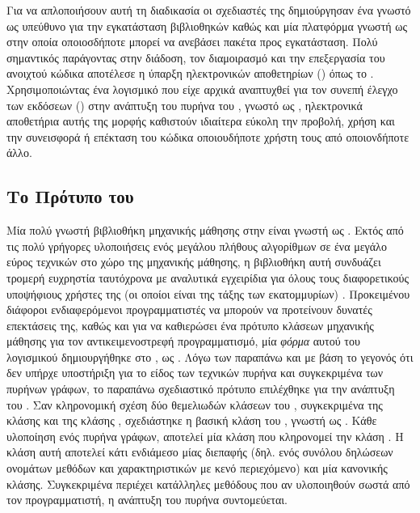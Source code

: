 Για να απλοποιήσουν αυτή τη διαδικασία οι σχεδιαστές της  δημιούργησαν ένα  γνωστό ως  υπεύθυνο για την εγκατάσταση βιβλιοθηκών καθώς και μία πλατφόρμα γνωστή ως  στην οποία οποιοσδήποτε μπορεί να ανεβάσει πακέτα προς εγκατάσταση.
Πολύ σημαντικός παράγοντας στην διάδοση, τον διαμοιρασμό και την επεξεργασία του ανοιχτού κώδικα αποτέλεσε η ύπαρξη ηλεκτρονικών αποθετηρίων () όπως το .
Χρησιμοποιώντας ένα λογισμικό που είχε αρχικά αναπτυχθεί για τον συνεπή έλεγχο των εκδόσεων () στην ανάπτυξη του πυρήνα του , γνωστό ως , ηλεκτρονικά αποθετήρια αυτής της μορφής καθιστούν ιδιαίτερα εύκολη την προβολή, χρήση και την συνεισφορά ή επέκταση του κώδικα οποιουδήποτε χρήστη τους από οποιονδήποτε άλλο.
\subsection{Το Πρότυπο του }
Μία πολύ γνωστή βιβλιοθήκη μηχανικής μάθησης στην  είναι γνωστή ως .
Εκτός από τις πολύ γρήγορες υλοποιήσεις ενός μεγάλου πλήθους αλγορίθμων σε ένα μεγάλο εύρος τεχνικών στο χώρο της μηχανικής μάθησης, η βιβλιοθήκη αυτή συνδυάζει τρομερή ευχρηστία ταυτόχρονα με αναλυτικά εγχειρίδια για όλους τους διαφορετικούς υποψήφιους χρήστες της (οι οποίοι είναι της τάξης των εκατομμυρίων) \cite{scikit}.
Προκειμένου διάφοροι ενδιαφερόμενοι προγραμματιστές να μπορούν να προτείνουν δυνατές επεκτάσεις της, καθώς και για να καθιερώσει ένα πρότυπο κλάσεων μηχανικής μάθησης για τον αντικειμενοστρεφή προγραμματισμό, μία \textit{φόρμα} αυτού του λογισμικού  δημιουργήθηκε στο , ως .
Λόγω των παραπάνω και με βάση το γεγονός ότι δεν υπήρχε υποστήριξη για το είδος των τεχνικών πυρήνα και συγκεκριμένα των πυρήνων γράφων, το παραπάνω σχεδιαστικό πρότυπο επιλέχθηκε για την ανάπτυξη του .
Σαν κληρονομική σχέση δύο θεμελιωδών κλάσεων του \texttt{}, συγκεκριμένα της κλάσης  και της κλάσης , σχεδιάστηκε η βασική κλάση του , γνωστή ως .
Κάθε υλοποίηση ενός πυρήνα γράφων, αποτελεί μία κλάση που κληρονομεί την κλάση . 
Η κλάση αυτή αποτελεί κάτι ενδιάμεσο μίας διεπαφής (δηλ. ενός συνόλου δηλώσεων ονομάτων μεθόδων και χαρακτηριστικών με κενό περιεχόμενο) και μία κανονικής κλάσης.
Συγκεκριμένα περιέχει κατάλληλες μεθόδους που αν υλοποιηθούν σωστά από τον προγραμματιστή, η ανάπτυξη του πυρήνα συντομεύεται.
